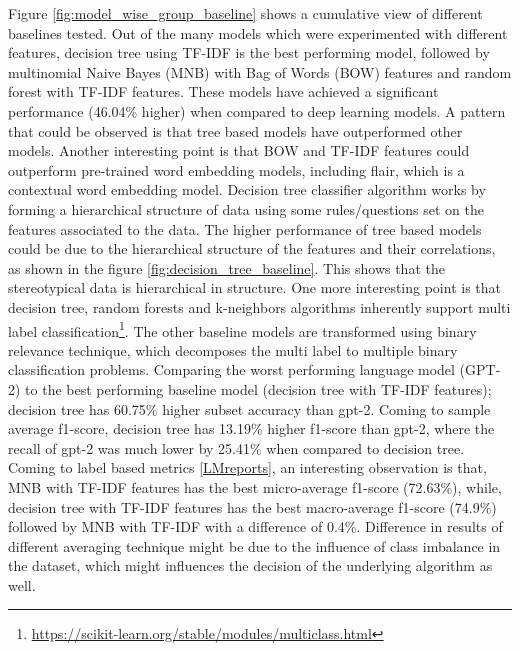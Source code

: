 Figure \ref{fig:model_wise_group_baseline} shows a cumulative view of different baselines tested. Out of the many models which were experimented with different features, decision tree using TF-IDF is the best performing model, followed by multinomial Naive Bayes (MNB) with Bag of Words (BOW) features and random forest with TF-IDF features. These models have achieved a significant performance (46.04\% higher) when compared to deep learning models. A pattern that could be observed is that tree based models have outperformed other models. Another interesting point is that BOW and TF-IDF features could outperform pre-trained word embedding models, including flair, which is a contextual word embedding model. Decision tree classifier algorithm works by forming a hierarchical structure of data using some rules/questions set on the features associated to the data\cite{kingsford2008decision}. The higher performance of tree based models could be due to the hierarchical structure of the features and their correlations, as shown in the figure \ref{fig:decision_tree_baseline}. This shows that the stereotypical data is hierarchical in structure. One more interesting point is that decision tree, random forests and k-neighbors algorithms inherently support multi label classification\footnote{\url{https://scikit-learn.org/stable/modules/multiclass.html}}. The other baseline models are transformed using binary relevance technique, which decomposes the multi label to multiple binary classification problems. Comparing the worst performing language model (GPT-2) to the best performing baseline model (decision tree with TF-IDF features); decision tree has 60.75\% higher subset accuracy than gpt-2.  Coming to sample average f1-score, decision tree has 13.19\% higher f1-score than gpt-2, where the recall of gpt-2 was much lower by 25.41\% when compared to decision tree. Coming to label based metrics \ref{LMreports}, an interesting observation is that, MNB with TF-IDF features has the best micro-average f1-score (72.63\%), while, decision tree with TF-IDF features has the best macro-average f1-score (74.9\%) followed by MNB with TF-IDF with a difference of 0.4\%. Difference in results of different averaging technique might be due to the influence of class imbalance in the dataset, which might influences the decision of the underlying algorithm as well. 
\pagebreak
 
